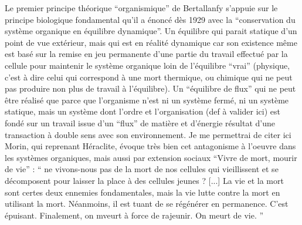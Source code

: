 Le premier principe théorique \enquote{organismique} de Bertallanfy s'appuie sur le principe biologique fondamental qu'il a énoncé dès 1929 avec la \enquote{conservation du système organique en équilibre dynamique}. Un équilibre qui parait statique d'un point de vue extérieur, mais qui est en réalité dynamique car son existence même est basé sur la remise en jeu permanente d'une partie du travail effectué par la cellule pour maintenir le système organique loin de l'équilibre \enquote{vrai} (physique, c'est à dire celui qui correspond à une mort thermique, ou chimique qui ne peut pas produire non plus de travail à l'équilibre). Un \enquote{équilibre de flux} qui ne peut être réalisé que parce que l'organisme n'est ni un système fermé, ni un système statique, mais un système dont l'ordre et l'organisation (def à valider ici) est fondé sur un travail issue d'un \enquote{flux} de matière et d'énergie résultat d'une transaction à double sens avec son environnement. \autocite[472]{Pouvreau2013} Je me permettrai de citer ici Morin, qui reprenant Héraclite, évoque très bien cet antagonisme à l'oeuvre dans les systèmes organiques, mais aussi par extension sociaux \enquote{Vivre de mort, mourir de vie} : \enquote{ ne vivons-nous pas de la mort de nos cellules qui vieillissent et se décomposent pour laisser la place à des cellules jeunes ? [...] La vie et la mort sont certes deux ennemies fondamentales, mais la vie lutte contre la mort en utilisant la mort. Néanmoins, il est tuant de se régénérer en permanence. C’est épuisant. Finalement, on mveurt à force de rajeunir. On meurt de vie. } \autocite{MorinXX} 

